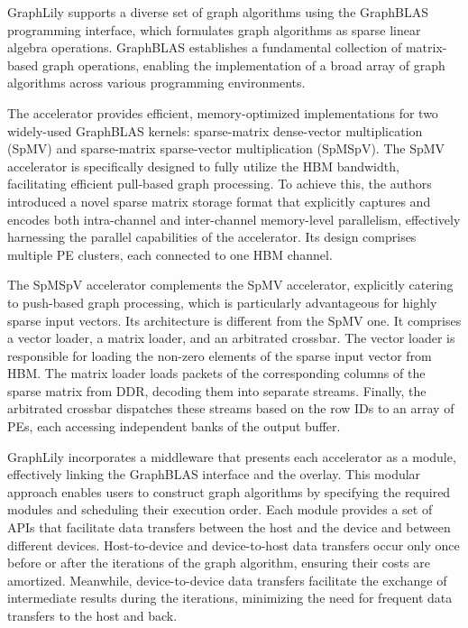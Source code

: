 GraphLily supports a diverse set of graph algorithms using the GraphBLAS~\cite{DBLP:journals/corr/KepnerABBFGHKLM16} programming interface, which formulates graph algorithms as sparse linear algebra operations.
GraphBLAS establishes a fundamental collection of matrix-based graph operations, enabling the implementation of a broad array of graph algorithms across various programming environments.

The accelerator provides efficient, memory-optimized implementations for two widely-used GraphBLAS kernels: sparse-matrix dense-vector multiplication (SpMV) and sparse-matrix sparse-vector multiplication (SpMSpV).
The SpMV accelerator is specifically designed to fully utilize the HBM bandwidth, facilitating efficient pull-based graph processing.
To achieve this, the authors introduced a novel sparse matrix storage format that explicitly captures and encodes both intra-channel and inter-channel memory-level parallelism, effectively harnessing the parallel capabilities of the accelerator. Its design comprises multiple PE clusters, each connected to one HBM channel.

The SpMSpV accelerator complements the SpMV accelerator, explicitly catering to push-based graph processing, which is particularly advantageous for highly sparse input vectors.
Its architecture is different from the SpMV one.
It comprises a vector loader, a matrix loader, and an arbitrated crossbar.
The vector loader is responsible for loading the non-zero elements of the sparse input vector from HBM. The matrix loader loads packets of the corresponding columns of the sparse matrix from DDR, decoding them into separate streams.
Finally, the arbitrated crossbar dispatches these streams based on the row IDs to an array of PEs, each accessing independent banks of the output buffer.

GraphLily incorporates a middleware that presents each accelerator as a module, effectively linking the GraphBLAS interface and the overlay.
This modular approach enables users to construct graph algorithms by specifying the required modules and scheduling their execution order.
Each module provides a set of APIs that facilitate data transfers between the host and the device and between different devices.
Host-to-device and device-to-host data transfers occur only once before or after the iterations of the graph algorithm, ensuring their costs are amortized.
Meanwhile, device-to-device data transfers facilitate the exchange of intermediate results during the iterations, minimizing the need for frequent data transfers to the host and back.


